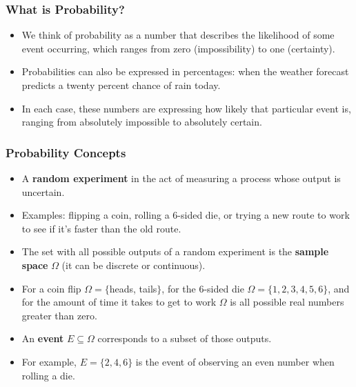 \documentclass[handout]{beamer}
\begin{document}
\begin{frame}\frametitle{What is Probability?}
\scriptsize{

\begin{itemize}
 \item We think of probability as a number that describes the likelihood of some event occurring, which ranges from zero (impossibility) to one (certainty).
 \item Probabilities can also be expressed in percentages: when the weather forecast predicts a twenty percent chance of rain today. 
 \item In each case, these numbers are expressing how likely that particular event is, ranging from absolutely impossible to absolutely certain.
\end{itemize}

}

\end{frame}



\begin{frame}\frametitle{Probability Concepts}
\scriptsize{

\begin{itemize}
 \item A \textbf{random experiment} in the act of measuring a process whose output is uncertain. 
 \item Examples: flipping a coin, rolling a 6-sided die, or trying a new route to work to see if it’s faster than the old route.
 \item The set with all possible outputs of a random experiment is the \textbf{sample space} $\Omega$ (it can be discrete or continuous).
 \item For a coin flip  $\Omega = \{$heads, tails$\}$, for the 6-sided die  $\Omega = \{1,2,3,4,5,6\}$, and  for the amount of time it takes to get to work $\Omega$ is all possible real numbers greater than zero.
 \item An \textbf{event} $E \subseteq \Omega$ corresponds to a subset of those outputs.
 \item For example, $E = \{ 2,4,6 \}$ is the event of observing an even number when rolling a die.
\end{itemize}

}

\end{frame}
\end{document}
